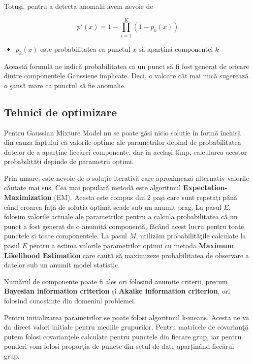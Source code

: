 Totuşi, pentru a detecta anomalii avem nevoie de 

\begin{equation}
    p'(x) = 1 - \prod_{i=1}^{K} \left(1 - p_k(x)\right)
\end{equation}
    
\begin{itemize}
    \item $p_k(x)$ este probabilitatea ca punctul $x$ să 
    aparțină componentei $k$
\end{itemize}

Această formulă ne indică probabilitatea ca un punct să fi fost generat de oricare 
dintre componentele Gaussiene implicate. Deci, o valoare cât mai mică sugerează 
o şansă mare ca punctul să fie anomalie.

\subsection{Tehnici de optimizare}

Pentru Gaussian Mixture Model nu se poate găsi nicio 
soluție în formă închisă din cauza faptului că 
valorile optime ale parametrilor depind de probabilitatea 
datelor de a aparține fiecărei componente, dar în același 
timp, calcularea acestor probabilități depinde de 
parametrii optimi.

Prin umare, este nevoie de o soluție iterativă care 
aproximează alternativ valorile căutate mai sus.
Cea mai populară metodă este algoritmul 
\textbf{Expectation-Maximization} (EM). Acesta este compus din 
2 pași care sunt repetați până când eroarea față de 
soluția optimă scade sub un anumit prag. La pasul $E$,
folosim valorile actuale ale parametrilor pentru a 
calcula probabilitatea că un punct a fost generat 
de o anumită componentă, făcând acest lucru pentru 
toate punctele și toate componentele. La pasul $M$,
utilizăm probabilităţile calculate la pasul $E$ 
pentru a estima valorile parametrilor optimi 
cu metoda \textbf{Maximum Likelihood Estimation} care caută 
să maximizeze probabilitatea de observare a datelor 
sub un anumit model statistic.

Numărul de componente poate fi ales ori folosind anumite 
criterii, precum \textbf{Bayesian information criterion} 
și \textbf{Akaike information criterion}, 
ori folosind cunoștințe 
din domeniul problemei.

Pentru inițializarea parametrilor se poate folosi 
algoritmul k-means. Acesta ne va da direct valori 
inițiale pentru mediile grupurilor. Pentru matricele 
de covarianţă putem folosi covarianţele calculate 
pentru punctele din fiecare grup, iar pentru ponderi 
vom folosi proporția de puncte din setul de date
aparținând fiecărui grup\cite{EM-GMM-INIT}.

